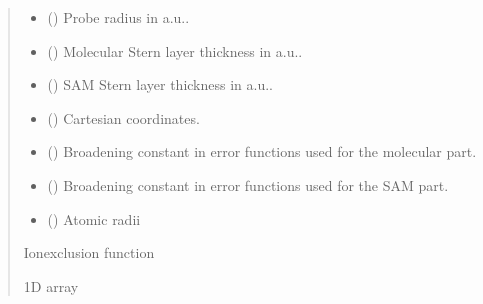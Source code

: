 \documentclass[letterpaper,10pt,english]{sphinxmanual}
\begin{document}
\begin{fulllineitems}
\begin{fulllineitems}
\begin{quote}
\begin{description}
\begin{itemize}
\item {} 
\sphinxAtStartPar
{} () \textendash{} Probe radius in a.u..

\item {} 
\sphinxAtStartPar
{} () \textendash{} Molecular Stern layer thickness in a.u..

\item {} 
\sphinxAtStartPar
{} () \textendash{} SAM Stern layer thickness in a.u..

\item {} 
\sphinxAtStartPar
{} () \textendash{} Cartesian coordinates.

\item {} 
\sphinxAtStartPar
{} () \textendash{} Broadening constant in error functions used for the molecular part.

\item {} 
\sphinxAtStartPar
{} () \textendash{} Broadening constant in error functions used for the SAM part.

\item {} 
\sphinxAtStartPar
{} () \textendash{} Atomic radii

\end{itemize}

\sphinxAtStartPar
Ion\sphinxhyphen{}exclusion function

\sphinxAtStartPar
1D array

\end{description}\end{quote}

\end{fulllineitems}



\end{fulllineitems}
\end{document}

